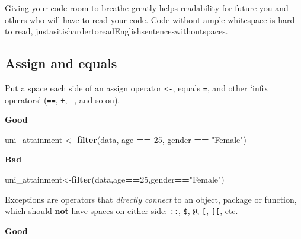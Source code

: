 \documentclass[]{book}
\newenvironment{Shaded}{\begin{snugshade}}{\end{snugshade}}
\newcommand{\DecValTok}[1]{\textcolor[rgb]{0.00,0.00,0.81}{#1}}
\newcommand{\KeywordTok}[1]{\textcolor[rgb]{0.13,0.29,0.53}{\textbf{#1}}}
\newcommand{\NormalTok}[1]{#1}
\newcommand{\OperatorTok}[1]{\textcolor[rgb]{0.81,0.36,0.00}{\textbf{#1}}}
\newcommand{\StringTok}[1]{\textcolor[rgb]{0.31,0.60,0.02}{#1}}
\begin{document}
Giving your code room to breathe greatly helps readability for future-you and others who will have to read your code. Code without ample whitespace is hard to read, justasitishardertoreadEnglishsentenceswithoutspaces.

\hypertarget{assign-and-equals}{%
\subsection{Assign and equals}\label{assign-and-equals}}

Put a space each side of an assign operator \texttt{\textless{}-}, equals \texttt{=}, and other `infix operators' (\texttt{==}, \texttt{+}, \texttt{-}, and so on).

\textbf{Good}

\begin{Shaded}
\begin{Highlighting}[]
\NormalTok{uni_attainment <-}\StringTok{ }\KeywordTok{filter}\NormalTok{(data, age }\OperatorTok{==}\StringTok{ }\DecValTok{25}\NormalTok{, gender }\OperatorTok{==}\StringTok{ "Female"}\NormalTok{)}
\end{Highlighting}
\end{Shaded}

\textbf{Bad}

\begin{Shaded}
\begin{Highlighting}[]
\NormalTok{uni_attainment<-}\KeywordTok{filter}\NormalTok{(data,age}\OperatorTok{==}\DecValTok{25}\NormalTok{,gender}\OperatorTok{==}\StringTok{"Female"}\NormalTok{)}
\end{Highlighting}
\end{Shaded}

Exceptions are operators that \emph{directly connect} to an object, package or function, which should \textbf{not} have spaces on either side: \texttt{::}, \texttt{\$}, \texttt{@}, \texttt{{[}}, \texttt{{[}{[}}, etc.

\textbf{Good}

\begin{Shaded}
\end{Shaded}
\end{document}
